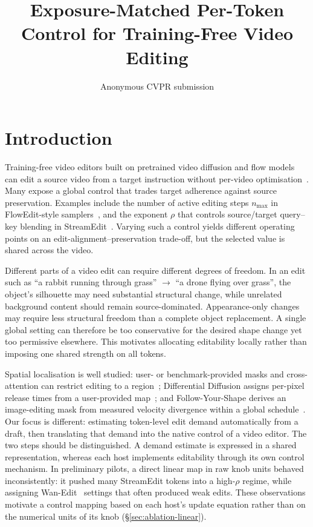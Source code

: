 \documentclass[10pt,twocolumn]{article}
\title{Exposure-Matched Per-Token Control for Training-Free Video Editing}
\author{Anonymous CVPR submission}
\date{}
\begin{document}
\maketitle

\section{Introduction}

Training-free video editors built on pretrained video diffusion and flow models~\cite{wan2025,selfforcing2025} can edit a source video from a target instruction without per-video optimisation~\cite{flowedit2025,streamedit2026,tokenflow2024}. Many expose a global control that trades target adherence against source preservation. Examples include the number of active editing steps $n_{\max}$ in FlowEdit-style samplers~\cite{flowedit2025,flowdirector2026}, and the exponent $\rho$ that controls source/target query--key blending in StreamEdit~\cite{streamedit2026}. Varying such a control yields different operating points on an edit-alignment--preservation trade-off, but the selected value is shared across the video.

Different parts of a video edit can require different degrees of freedom. In an edit such as ``a rabbit running through grass'' $\rightarrow$ ``a drone flying over grass'', the object's silhouette may need substantial structural change, while unrelated background content should remain source-dominated. Appearance-only changes may require less structural freedom than a complete object replacement. A single global setting can therefore be too conservative for the desired shape change yet too permissive elsewhere. This motivates allocating editability locally rather than imposing one shared strength on all tokens.

Spatial localisation is well studied: user- or benchmark-provided masks and cross-attention can restrict editing to a region~\cite{diffedit2023,p2p2023}; Differential Diffusion assigns per-pixel release times from a user-provided map~\cite{diffdiff}; and Follow-Your-Shape derives an image-editing mask from measured velocity divergence within a global schedule~\cite{followyourshape}. Our focus is different: estimating token-level edit demand automatically from a draft, then translating that demand into the native control of a video editor. The two steps should be distinguished. A demand estimate is expressed in a shared representation, whereas each host implements editability through its own control mechanism. In preliminary pilots, a direct linear map in raw knob units behaved inconsistently: it pushed many StreamEdit tokens into a high-$\rho$ regime, while assigning Wan-Edit~\cite{five2025} settings that often produced weak edits. These observations motivate a control mapping based on each host's update equation rather than on the numerical units of its knob (\S\ref{sec:ablation-linear}).
\end{document}
